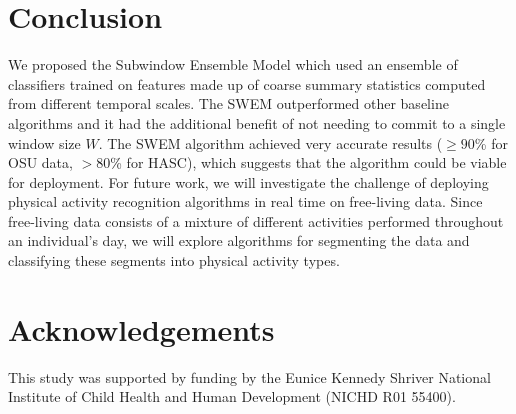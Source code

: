 \documentclass[letterpaper]{article}
\begin{document}
\section{Conclusion}
We proposed the Subwindow Ensemble Model which used an ensemble of classifiers trained on features made up of coarse summary statistics computed from different temporal scales. The SWEM outperformed other baseline algorithms and it had the additional benefit of not needing to commit to a single window size $W$. The SWEM algorithm achieved very accurate results ($\geq 90$\% for OSU data, $>80$\% for HASC), which suggests that the algorithm could be viable for deployment. For future work, we will investigate the challenge of deploying physical activity recognition algorithms in real time on free-living data. Since free-living data consists of a mixture of different activities performed throughout an individual's day, we will explore algorithms for segmenting the data and classifying these segments into physical activity types. 

\section{Acknowledgements}
This study was supported by funding by the Eunice Kennedy Shriver National Institute of Child Health and Human Development (NICHD R01 55400).



\end{document}
